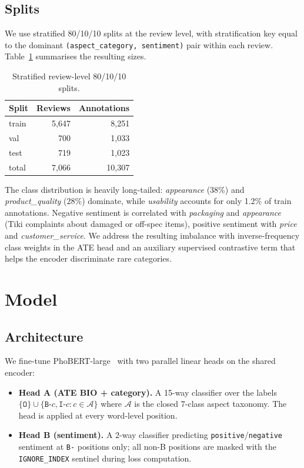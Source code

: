 \documentclass[conference]{IEEEtran}
\begin{document}
\subsection{Splits}

We use stratified 80/10/10 splits at the review level, with stratification
key equal to the dominant \texttt{(aspect\_category, sentiment)} pair
within each review. Table~\ref{tab:splits} summarises the resulting
sizes.

\begin{table}[t]
\caption{Stratified review-level 80/10/10 splits.}
\label{tab:splits}
\centering
\begin{tabular}{lrr}
\toprule
Split & Reviews & Annotations \\
\midrule
train & 5{,}647 & 8{,}251 \\
val   &   700   & 1{,}033 \\
test  &   719   & 1{,}023 \\
\midrule
total & 7{,}066 & 10{,}307 \\
\bottomrule
\end{tabular}
\end{table}

The class distribution is heavily long-tailed:
\textit{appearance} (38\%) and \textit{product\_quality} (28\%) dominate,
while \textit{usability} accounts for only 1.2\% of train annotations.
Negative sentiment is correlated with \textit{packaging} and
\textit{appearance} (Tiki complaints about damaged or off-spec items),
positive sentiment with \textit{price} and \textit{customer\_service}.
We address the resulting imbalance with inverse-frequency class weights
in the ATE head and an auxiliary supervised contrastive term that helps
the encoder discriminate rare categories.

\section{Model}\label{sec:model}

\subsection{Architecture}

We fine-tune PhoBERT-large~\cite{nguyen2020phobert} with two parallel
linear heads on the shared encoder:

\begin{itemize}
    \item \textbf{Head A (ATE BIO + category).} A 15-way classifier
    over the labels $\{\texttt{O}\} \cup \{\texttt{B-}c, \texttt{I-}c
    : c \in \mathcal{A}\}$ where $\mathcal{A}$ is the closed 7-class
    aspect taxonomy. The head is applied at every word-level position.
    \item \textbf{Head B (sentiment).} A 2-way classifier predicting
    \texttt{positive}/\texttt{negative} sentiment at \texttt{B-}
    positions only; all non-B positions are masked with the
    \texttt{IGNORE\_INDEX} sentinel during loss computation.
\end{itemize}
\end{document}
